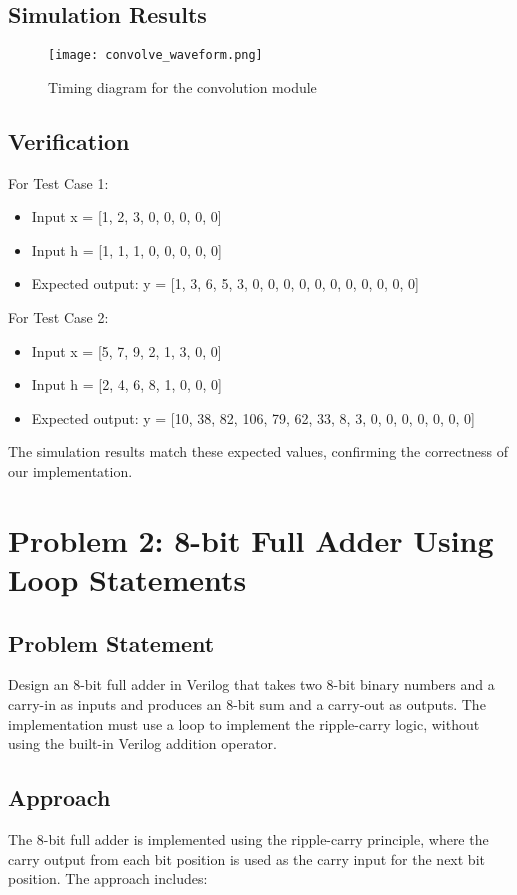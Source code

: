 \documentclass{article}
\begin{document}
\subsection{Simulation Results}

\begin{figure}[H]
	\centering
	\texttt{[image: convolve\_waveform.png]}
	\caption{Timing diagram for the convolution module}
	\label{fig:convolve_waveform}
\end{figure}

\subsection{Verification}
For Test Case 1:
\begin{itemize}
	\item Input x = [1, 2, 3, 0, 0, 0, 0, 0]
	\item Input h = [1, 1, 1, 0, 0, 0, 0, 0]
	\item Expected output: y = [1, 3, 6, 5, 3, 0, 0, 0, 0, 0, 0, 0, 0, 0, 0, 0]
\end{itemize}

For Test Case 2:
\begin{itemize}
	\item Input x = [5, 7, 9, 2, 1, 3, 0, 0]
	\item Input h = [2, 4, 6, 8, 1, 0, 0, 0]
	\item Expected output: y = [10, 38, 82, 106, 79, 62, 33, 8, 3, 0, 0, 0, 0, 0, 0, 0]
\end{itemize}

The simulation results match these expected values, confirming the correctness of our implementation.

\section{Problem 2: 8-bit Full Adder Using Loop Statements}

\subsection{Problem Statement}
Design an 8-bit full adder in Verilog that takes two 8-bit binary numbers and a carry-in as inputs and produces an 8-bit sum and a carry-out as outputs. The implementation must use a loop to implement the ripple-carry logic, without using the built-in Verilog addition operator.

\subsection{Approach}
The 8-bit full adder is implemented using the ripple-carry principle, where the carry output from each bit position is used as the carry input for the next bit position. The approach includes:
\end{document}
